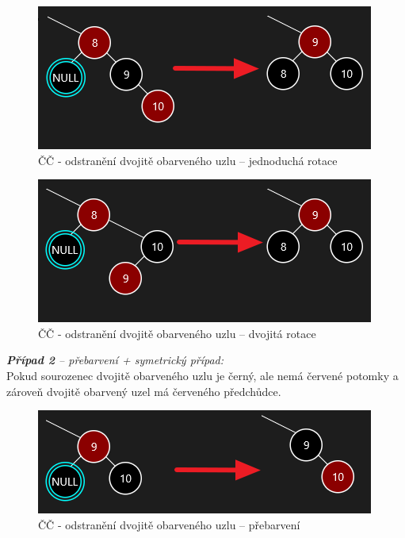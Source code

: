 \documentclass[
  biblatex=false,
  font=serif,
  glossaries=false,
  tables=false,
  theorems=false,
  index
]{kidiplom}
\begin{document}
\begin{figure}[h!]
\centering
	\includegraphics[scale=0.8]{obrazky/25Pripad1.png}
	\caption{ČČ - odstranění dvojitě obarveného uzlu -- jednoduchá rotace}
	\label{pripad1}
\end{figure}

\begin{figure}[h!]
\centering
	\includegraphics[scale=0.8]{obrazky/26Pripad1_2.png}
	\caption{ČČ - odstranění dvojitě obarveného uzlu -- dvojitá rotace}
	\label{pripad12}
\end{figure}

\newpage
\noindent \textit{\textbf{Případ 2} -- přebarvení + symetrický případ:}\\
Pokud sourozenec dvojitě obarveného uzlu je černý, ale nemá červené potomky a zároveň dvojitě obarvený uzel má červeného předchůdce.
\begin{figure}[h!]
\centering
	\includegraphics[scale=0.8]{obrazky/27Pripad2.png}
	\caption{ČČ - odstranění dvojitě obarveného uzlu -- přebarvení}
\end{figure}\\
\end{document}
